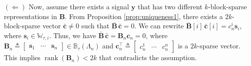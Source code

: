 \documentclass[10pt,twocolumn,twoside] {IEEEtran}
\begin{document}
{\noindent $(\Longleftarrow)$ Now, assume there exists a signal ${\boldsymbol{y}}$ that has two different $k$-block-sparse representations in ${\boldsymbol{B}}$. 
From Proposition \ref{prop:uniqueness1}, there exists a $2k$-block-sparse vector $\bar{\boldsymbol{c}} \neq 0$ such that $\bar{\boldsymbol{B}} \, \bar{\boldsymbol{c}} = 0$. We can rewrite $\bar{\boldsymbol{B}}[i] \, \bar{\boldsymbol{c}}[i] = c_n^i {\boldsymbol{s}}_i$, where ${\boldsymbol{s}}_i \in \mathbb{W}_{\tau, i}$. Thus, we have $\bar{\boldsymbol{B}} \, \bar{\boldsymbol{c}} = {\boldsymbol{B}}_n {\boldsymbol{c}}_n = 0$, where ${\boldsymbol{B}}_n \triangleq \begin{bmatrix} {\boldsymbol{s}}_1 \!& \cdots \!& {\boldsymbol{s}}_n \end{bmatrix} \in \mathbb{B}_{\tau}(\Lambda_n)$ and ${\boldsymbol{c}}_n^{\top} \triangleq \begin{bmatrix} c_n^1 \!& \cdots \!& c_n^n \end{bmatrix}$ is a $2k$-sparse vector. This implies ${\operatorname{rank}}({\boldsymbol{B}}_n) < 2k$ that contradicts the assumption.

\vspace{0mm}
}
\end{document}
